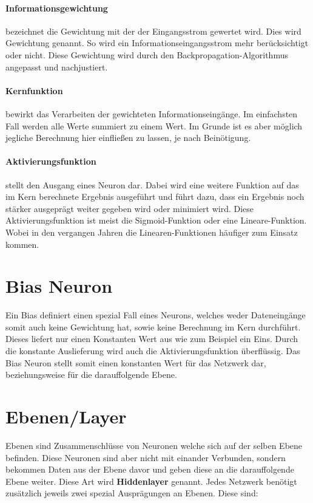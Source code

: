 \paragraph{Informationsgewichtung} bezeichnet die Gewichtung mit der der Eingangsstrom gewertet wird. Dies wird Gewichtung genannt. So wird ein Informationseingangsstrom mehr berücksichtigt oder nicht. Diese Gewichtung wird durch den Backpropagation-Algorithmus angepasst und nachjustiert.

\paragraph{Kernfunktion} bewirkt das Verarbeiten der gewichteten Informationseingänge. Im einfachsten Fall werden alle Werte summiert zu einem Wert. Im Grunde ist es aber möglich jegliche Berechnung hier einfließen zu lassen, je nach Beinötigung.

\paragraph{Aktivierungsfunktion} stellt den Ausgang eines Neuron dar. Dabei wird eine weitere Funktion auf das im Kern berechnete Ergebnis ausgeführt und führt dazu, dass ein Ergebnis noch stärker ausgeprägt weiter gegeben wird oder minimiert wird. Diese Aktivierungsfunktion ist meist die Sigmoid-Funktion oder eine Lineare-Funktion. Wobei in den vergangen Jahren die Linearen-Funktionen häufiger zum Einsatz kommen. 

\section{Bias Neuron}

Ein Bias definiert einen spezial Fall eines Neurons, welches weder Dateneingänge somit auch keine Gewichtung hat, sowie keine Berechnung im Kern durchführt. Dieses liefert nur einen Konstanten Wert aus wie zum Beispiel ein Eins. Durch die konstante Auslieferung wird auch die Aktivierungsfunktion überflüssig. Das Bias Neuron stellt somit einen konstanten Wert für das Netzwerk dar, beziehungsweise für die darauffolgende Ebene.

\section{Ebenen/Layer}

Ebenen sind Zusammenschlüsse von Neuronen welche sich auf der selben Ebene befinden. Diese Neuronen sind aber nicht mit einander Verbunden, sondern bekommen Daten aus der Ebene davor und geben diese an die darauffolgende Ebene weiter. Diese Art wird \textbf{Hiddenlayer} genannt. Jedes Netzwerk benötigt zusätzlich jeweils zwei spezial Ausprägungen an Ebenen. Diese sind:

